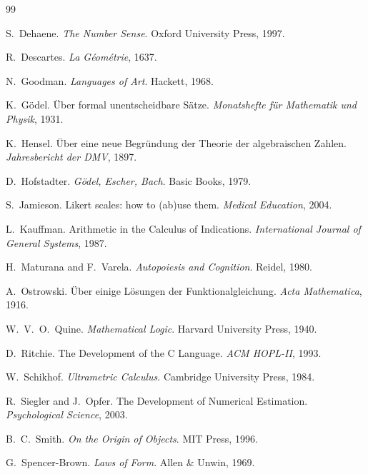 \documentclass[12pt,a4paper]{article}
\theoremstyle{definition}
\theoremstyle{remark}
\begin{document}

\begin{thebibliography}{99}

S.~Dehaene.
\newblock \emph{The Number Sense}.
\newblock Oxford University Press, 1997.

R.~Descartes.
\newblock \emph{La G\'eom\'etrie}, 1637.

N.~Goodman.
\newblock \emph{Languages of Art}.
\newblock Hackett, 1968.

K.~G\"odel.
\newblock \"Uber formal unentscheidbare S\"atze.
\newblock \emph{Monatshefte f\"ur Mathematik und Physik}, 1931.

K.~Hensel.
\newblock \"Uber eine neue Begr\"undung der Theorie der algebraischen Zahlen.
\newblock \emph{Jahresbericht der DMV}, 1897.

D.~Hofstadter.
\newblock \emph{G\"odel, Escher, Bach}.
\newblock Basic Books, 1979.

S.~Jamieson.
\newblock Likert scales: how to (ab)use them.
\newblock \emph{Medical Education}, 2004.

L.~Kauffman.
\newblock Arithmetic in the Calculus of Indications.
\newblock \emph{International Journal of General Systems}, 1987.

H.~Maturana and F.~Varela.
\newblock \emph{Autopoiesis and Cognition}.
\newblock Reidel, 1980.

A.~Ostrowski.
\newblock \"Uber einige L\"osungen der Funktionalgleichung.
\newblock \emph{Acta Mathematica}, 1916.

W.~V.~O.~Quine.
\newblock \emph{Mathematical Logic}.
\newblock Harvard University Press, 1940.

D.~Ritchie.
\newblock The Development of the C Language.
\newblock \emph{ACM HOPL-II}, 1993.

W.~Schikhof.
\newblock \emph{Ultrametric Calculus}.
\newblock Cambridge University Press, 1984.

R.~Siegler and J.~Opfer.
\newblock The Development of Numerical Estimation.
\newblock \emph{Psychological Science}, 2003.

B.~C.~Smith.
\newblock \emph{On the Origin of Objects}.
\newblock MIT Press, 1996.

G.~Spencer-Brown.
\newblock \emph{Laws of Form}.
\newblock Allen \& Unwin, 1969.


\end{thebibliography}
\end{document}
